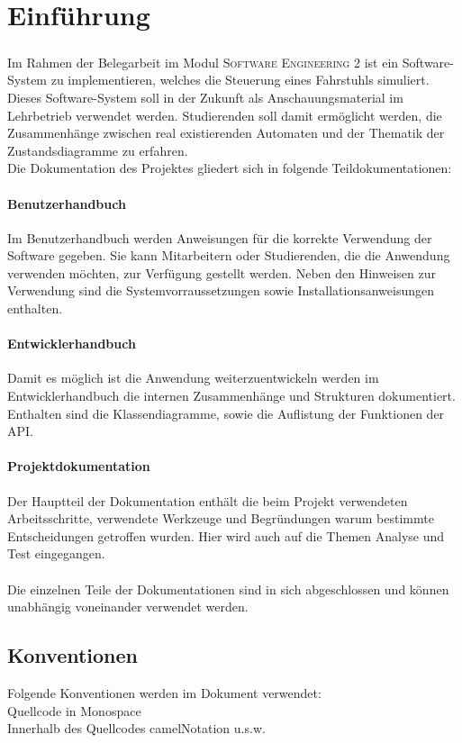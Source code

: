 \chapter{Einführung}
\paragraph{}
Im Rahmen der Belegarbeit im Modul \textsc{Software Engineering 2} ist ein Software-System zu implementieren, welches die Steuerung eines Fahrstuhls simuliert. Dieses Software-System soll in der Zukunft als Anschauungsmaterial im Lehrbetrieb verwendet werden. Studierenden soll damit ermöglicht werden, die Zusammenhänge zwischen real existierenden Automaten und der Thematik der Zustandsdiagramme zu erfahren.
\\
Die Dokumentation des Projektes gliedert sich in folgende Teildokumentationen:
\subsubsection*{Benutzerhandbuch}
Im Benutzerhandbuch werden Anweisungen für die korrekte Verwendung der Software gegeben. Sie kann Mitarbeitern oder Studierenden, die die Anwendung verwenden möchten, zur Verfügung gestellt werden. Neben den Hinweisen zur Verwendung sind die Systemvorraussetzungen sowie Installationsanweisungen enthalten.

\subsubsection*{Entwicklerhandbuch}
Damit es möglich ist die Anwendung weiterzuentwickeln werden im Entwicklerhandbuch die internen Zusammenhänge und Strukturen dokumentiert. Enthalten sind die Klassendiagramme, sowie die Auflistung der Funktionen der \gls{API}.\\

\subsubsection*{Projektdokumentation}
Der Hauptteil der Dokumentation enthält die beim Projekt verwendeten Arbeitsschritte, verwendete Werkzeuge und Begründungen warum bestimmte Entscheidungen getroffen wurden.
Hier wird auch auf die Themen Analyse und Test eingegangen.
\\\\
Die einzelnen Teile der Dokumentationen sind in sich abgeschlossen und können unabhängig voneinander verwendet werden.

\section*{Konventionen}
Folgende Konventionen werden im Dokument verwendet:\\
Quellcode in Monospace\\
Innerhalb des Quellcodes camelNotation u.s.w.